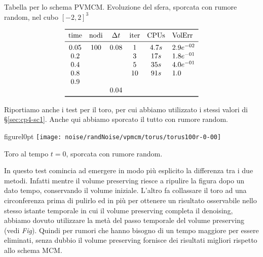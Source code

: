 \begin{table}[htb!]
\caption{Tabella per lo schema PVMCM. Evoluzione del sfera, sporcata
  con rumore random, nel cubo $[-2,2]^3$}
\label{tab:cp4-sc2-1-01}
\[
\begin{array}{*{5}{c}l}
    \toprule
    \text{time} &\text{nodi} &\Delta t &\text{iter} &\text{CPUs}&\text{VolErr} \\
    \midrule
     0.05       & 100        & 0.08    & 1          & 4.7s     &2.9e^{-02}\\
     0.2        &            &         & 3          & 17s      &1.8e^{-01}\\ 
     0.4        &            &         & 5          & 35s      &4.0e^{-01}\\ 
     0.8        &            &         & 10         & 91s      &1.0\\
     0.9        &            &         &            &          &   \\
                &            & 0.04    &            &          &   \\  
     \bottomrule
\end{array}
\]
\end{table}
\newpage 
Riportiamo anche i test per il toro, per cui abbiamo utilizzato i
stessi valori di §\ref{sec:cp4-sc1}. Anche qui abbiamo
sporcato il tutto con rumore random.

\begin{wrapfloat}{figure}{l}{0pt}
\texttt{[image: noise/randNoise/vpmcm/torus/torus100r-0-00]}
\caption{Toro al tempo $t=0$, sporcata con rumore random.}
\end{wrapfloat}

In questo test comincia ad emergere in modo più esplicito la
differenza tra i due metodi. Infatti mentre il volume preserving
riesce a ripulire la figura dopo un dato tempo, conservando il volume 
iniziale. L'altro fa collassare il toro ad una circonferenza prima di
pulirlo ed in più per ottenere un risultato osservabile nello stesso
istante temporale in cui il volume preserving completa il denoising,
abbiamo dovuto utilizzare la metà del passo temporale del
volume preserving (vedi \emph{Fig}). Quindi per rumori che hanno
bisogno di un tempo maggiore per essere eliminati, senza dubbio il
volume preserving fornisce dei risultati migliori rispetto allo schema
MCM.

